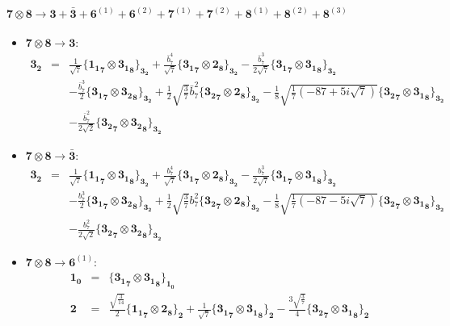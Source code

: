 \documentclass[english]{article}
\newcommand{\subcg}[3]{\big\{ {#1}\otimes{#2}\big\}^{}_{#3}}
\newcommand{\rep}[1]{\mathbf{#1}}
\begin{document}
\paragraph*{\Large $\rep{7}\otimes\rep{8}\to\rep{3}+\rep{\bar{3}}+\rep{6}^{(1)}+\rep{6}^{(2)}+\rep{7}^{(1)}+\rep{7}^{(2)}+\rep{8}^{(1)}+\rep{8}^{(2)}+\rep{8}^{(3)}$}
\begin{itemize}
\item $\rep{7}\otimes\rep{8}\to\rep{3}$:
\begin{eqnarray*}
\rep{3_2} &=& \frac{1}{\sqrt{7}}\subcg{\rep{1_1}_{\rep{7}}}{\rep{3_1}_{\rep{8}}}{\rep{3_2}}+\frac{\bar{b}_7^4}{\sqrt{7}}\subcg{\rep{3_1}_{\rep{7}}}{\rep{2}_{\rep{8}}}{\rep{3_2}}-\frac{\bar{b}_7^3}{2 \sqrt{7}}\subcg{\rep{3_1}_{\rep{7}}}{\rep{3_1}_{\rep{8}}}{\rep{3_2}} \\ 
 & & -\frac{\bar{b}_7^3}{2}\subcg{\rep{3_1}_{\rep{7}}}{\rep{3_2}_{\rep{8}}}{\rep{3_2}}+\frac{1}{2} \sqrt{\frac{3}{7}} \bar{b}_7^2\subcg{\rep{3_2}_{\rep{7}}}{\rep{2}_{\rep{8}}}{\rep{3_2}}-\frac{1}{8} \sqrt{\frac{1}{7} \left(-87+5 i \sqrt{7}\right)}\subcg{\rep{3_2}_{\rep{7}}}{\rep{3_1}_{\rep{8}}}{\rep{3_2}} \\ 
 & & -\frac{\bar{b}_7^2}{2 \sqrt{2}}\subcg{\rep{3_2}_{\rep{7}}}{\rep{3_2}_{\rep{8}}}{\rep{3_2}}
\end{eqnarray*}
\item $\rep{7}\otimes\rep{8}\to\rep{\bar{3}}$:
\begin{eqnarray*}
\rep{3_2} &=& \frac{1}{\sqrt{7}}\subcg{\rep{1_1}_{\rep{7}}}{\rep{3_1}_{\rep{8}}}{\rep{3_2}}+\frac{b_7^4}{\sqrt{7}}\subcg{\rep{3_1}_{\rep{7}}}{\rep{2}_{\rep{8}}}{\rep{3_2}}-\frac{b_7^3}{2 \sqrt{7}}\subcg{\rep{3_1}_{\rep{7}}}{\rep{3_1}_{\rep{8}}}{\rep{3_2}} \\ 
 & & -\frac{b_7^3}{2}\subcg{\rep{3_1}_{\rep{7}}}{\rep{3_2}_{\rep{8}}}{\rep{3_2}}+\frac{1}{2} \sqrt{\frac{3}{7}} b_7^2\subcg{\rep{3_2}_{\rep{7}}}{\rep{2}_{\rep{8}}}{\rep{3_2}}-\frac{1}{8} \sqrt{\frac{1}{7} \left(-87-5 i \sqrt{7}\right)}\subcg{\rep{3_2}_{\rep{7}}}{\rep{3_1}_{\rep{8}}}{\rep{3_2}} \\ 
 & & -\frac{b_7^2}{2 \sqrt{2}}\subcg{\rep{3_2}_{\rep{7}}}{\rep{3_2}_{\rep{8}}}{\rep{3_2}}
\end{eqnarray*}
\item $\rep{7}\otimes\rep{8}\to\rep{6}^{(1)}$:
\begin{eqnarray*}
\rep{1_0} &=& \subcg{\rep{3_1}_{\rep{7}}}{\rep{3_1}_{\rep{8}}}{\rep{1_0}}
\\
\rep{2} &=& \frac{\sqrt{\frac{3}{14}}}{2}\subcg{\rep{1_1}_{\rep{7}}}{\rep{2}_{\rep{8}}}{\rep{2}}+\frac{1}{\sqrt{7}}\subcg{\rep{3_1}_{\rep{7}}}{\rep{3_1}_{\rep{8}}}{\rep{2}}-\frac{3 \sqrt{\frac{3}{7}}}{4}\subcg{\rep{3_2}_{\rep{7}}}{\rep{3_1}_{\rep{8}}}{\rep{2}} \\ 

\end{eqnarray*}
\end{itemize}
\end{document}

